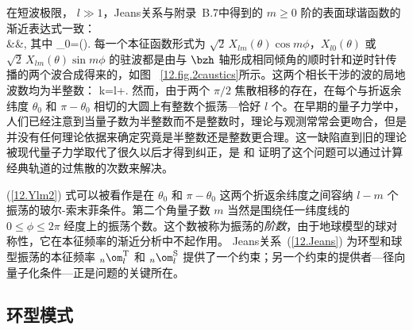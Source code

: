 在短波极限， $l\gg 1$，Jeans关系与附录~B.7中得到的 $m\geq 0$ 阶的表面球谐函数的渐近表达式一致：
\eqa \label{12.Ylm1}
 \nonumber \\
&&\mbox{}\times\cos{},
\ena
其中
\eq \label{12.Ylm2}
\theta_0=\arcsin\left(\right).
\en
每一个本征函数形式为
$\sqrt{2}\,X_{lm}(\theta)\cos m\phi$，$X_{l0}(\theta)$ 或
$\sqrt{2}\,X_{lm}(\theta)\sin m\phi$ 
的驻波都是由与 $\bzh$ 轴形成相同倾角的顺时针和逆时针传播的两个波合成得来的，如图
~\ref{12.fig.2caustics}所示。这两个相长干涉的波的局地波数均为半整数：  
\eq
k=\approx l+\half.
\en
然而，由于两个 $\pi/2$ 焦散相移的存在，在每个与折返余纬度 $\theta_0$ 和 $\pi-\theta_0$ 相切的大圆上有整数个振荡—恰好 $l$ 个。在早期的量子力学中，人们已经注意到当量子数为半整数而不是整数时，理论与观测常常会更吻合，但是并没有任何理论依据来确定究竟是半整数还是整数更合理。这一缺陷直到旧的理论被现代量子力学取代了很久以后才得到纠正，是 \textcite{keller58}和 \textcite{keller&rubinow60}证明了这个问题可以通过计算经典轨道的过焦散的次数来解决。

(\ref{12.Ylm2}) 式可以被看作是在 $\theta_0$ 和 $\pi-\theta_0$ 这两个折返余纬度之间容纳 $l-m$ 个振荡的玻尔-索末菲条件。第二个角量子数 $m$ 当然是围绕任一纬度线的 $0\leq \phi\leq 2\pi$ 经度上的振荡个数。这个数被称为振荡的{\em 阶数\/}，由于地球模型的球对称性，它在本征频率的渐近分析中不起作用。
Jeans关系~(\ref{12.Jeans}) 为环型和球型振荡的本征频率
${}_n\om_l^{\rm T}$ 和 ${}_n\om_l^{\rm S}$ 提供了一个约束；另一个约束的提供者---径向量子化条件---正是问题的关键所在。
%

\subsection{环型模式}
%
\label{12.sec.TOR}

